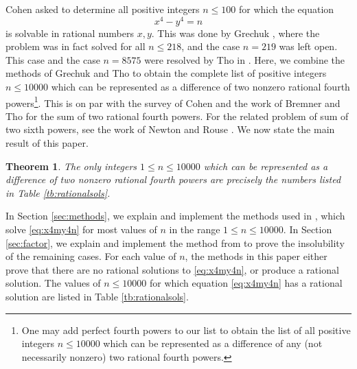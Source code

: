 \documentclass[a4paper,12pt,english,reqno]{amsart}
\newtheorem{theorem}{Theorem}
\begin{document}
Cohen \cite[Chapter 6, Exercise 53]{MR2312337} asked to determine all positive integers $n \leq 100$ for which the equation
\begin{equation}\label{eq:x4my4n}
	x^4-y^4=n
\end{equation}
is solvable in rational numbers $x,y$. This was done by Grechuk \cite[Section 6.3.4]{mainbook}, where the problem was in fact solved for all $n \leq 218$, and the case $n=219$ was left open. This case and the case $n=8575$ were resolved by Tho in \cite{THO2026125764}. Here, we combine the methods of Grechuk \cite[Section 6.3.4]{mainbook} and Tho \cite{THO2026125764} to obtain the complete list of positive integers $n \leq 10000$ which can be represented as a difference of two nonzero rational fourth powers\footnote{One may add perfect fourth powers to our list to obtain the list of all positive integers $n \leq 10000$ which can be represented as a difference of any (not necessarily nonzero) two rational fourth powers.}. This is on par with  the survey of Cohen \cite{MR2312337} and the work of Bremner and Tho \cite{MR4458887} for the sum of two rational fourth powers.  For the related problem of sum of two sixth powers, see the work of  Newton and Rouse \cite{NR}. We now state the main result of this paper. 
\begin{theorem}\label{th:main}
The only integers $1\leq n \leq 10000$ which can be represented as a difference of two nonzero rational fourth powers are precisely the numbers listed in Table \ref{tb:rationalsols}.
\end{theorem}

In Section \ref{sec:methods}, we explain and implement the methods used  in \cite{mainbook}, which solve \eqref{eq:x4my4n} for most values of $n$ in the range $1 \leq n \leq 10000$. In Section \ref{sec:factor}, we explain and implement the method from  \cite{THO2026125764} to prove the insolubility of the remaining cases. For each value of $n$, the methods in this paper either prove that there are no rational solutions to \eqref{eq:x4my4n}, or produce a rational solution. The values of $n\leq 10000$ for which equation \eqref{eq:x4my4n} has a rational solution are listed in Table \ref{tb:rationalsols}. 
\end{document}
